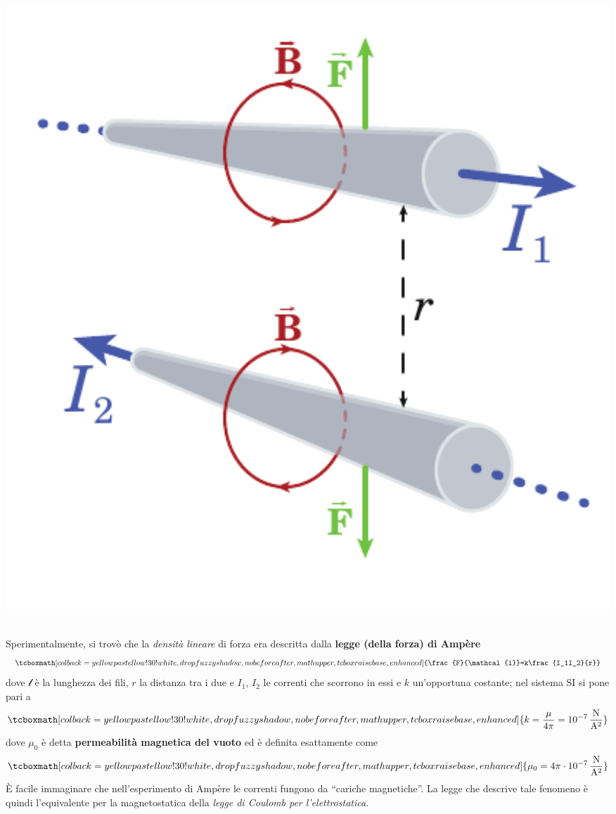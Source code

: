 \begin{minipage}{0.49\textwidth}
	\begin{center}
		\includegraphics[width=1\textwidth]{images/chp7/chp7ampere2.pdf}
	\end{center}
\end{minipage}\\
Sperimentalmente, si trovò che la \textit{densità lineare} di forza era descritta dalla \textbf{legge (della forza) di Ampère}
\begin{equation}
	\tcboxmath[colback=yellowpastellow!30!white,drop fuzzy shadow, nobeforeafter, math upper, tcbox raise base, enhanced]{\frac{F}{\mathcal{l}}=k\frac{I_1I_2}{r}}
\end{equation}
dove $\mathcal{l}$ è la lunghezza dei fili, $r$ la distanza tra i due e $I_1$, $I_2$ le correnti che scorrono in essi e $k$ un'opportuna costante; nel sistema SI si pone pari a
\begin{equation}
	\tcboxmath[colback=yellowpastellow!30!white,drop fuzzy shadow, nobeforeafter, math upper, tcbox raise base, enhanced]{k=\frac{\mu}{4\pi}=\SI[per-mode = fraction]{d-7}{\newton\per\ampere\squared}}
\end{equation}
dove $\mu_0$ è detta \textbf{permeabilità magnetica del vuoto} ed è definita esattamente come
\begin{equation}
	\tcboxmath[colback=yellowpastellow!30!white,drop fuzzy shadow, nobeforeafter, math upper, tcbox raise base, enhanced]{\mu_0=4\pi\cdot\SI[per-mode = fraction]{d-7}{\newton\per\ampere\squared}}
\end{equation}
È facile immaginare che nell'esperimento di Ampère le correnti fungono da ``cariche magnetiche''. La legge che descrive tale fenomeno è quindi l'equivalente per la magnetostatica della \textit{legge di Coulomb per l'elettrostatica}.
